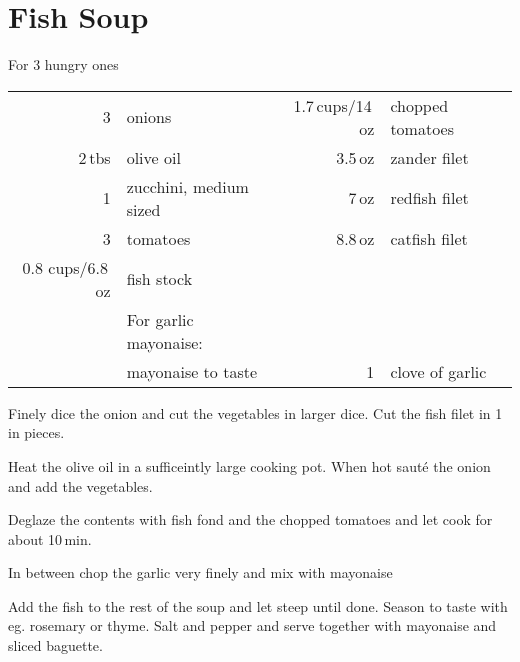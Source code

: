 \section{Fish Soup}
\begin{centering}
For 3 hungry ones
\end{centering}
\begin{table}[H]
\centering
\begin{tabular*}{1\textwidth}{rlrl}
3 & onions & 1.7\,cups/14\,oz & chopped tomatoes \\
2\,tbs & olive oil &3.5\,oz & zander filet\\
1 & zucchini, medium sized & 7\,oz & redfish filet\\
3 & tomatoes & 8.8\,oz & catfish filet\\
0.8 cups/6.8\,oz & fish stock && \\
&For garlic mayonaise:&&\\
& mayonaise to taste & 1 & clove of garlic\\
\end{tabular*}
\end{table}
\begin{Notes}
\item Finely dice the onion and cut the vegetables in larger dice. Cut the fish filet in 1\,in
  pieces. 
\item Heat the olive oil in a sufficeintly large cooking pot. When hot saut\'{e}
  the onion and add the vegetables.
\item Deglaze the contents with fish fond and the chopped tomatoes and let cook
  for about 10\,min. 
\item In between chop the garlic very finely and mix with mayonaise
\item Add the fish to the rest of the soup and let steep until done. Season to taste with eg.
  rosemary or thyme. Salt and pepper and serve together with mayonaise and
  sliced baguette.
\end{Notes}
\vfill
\begin{figure}[H]
  \centering
\end{figure}
\newpage

